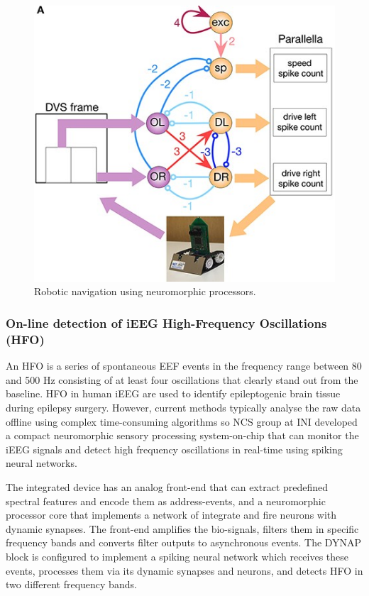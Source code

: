 \documentclass[main]{subfiles}
\begin{document}
%
\begin{figure}[h]
    \centering
    \includegraphics[width=0.8\linewidth]{12_NeuromorphicSystems2/figures/robo.jpg}
    \caption{Robotic navigation using neuromorphic processors.}
    \label{fig:robo}
\end{figure}
%

\subsubsection*{On-line detection of iEEG High-Frequency Oscillations (HFO)}

An HFO is a series of spontaneous EEF events in the frequency range between 80 and 500 Hz consisting of at least four oscillations that clearly stand out from the baseline. HFO in human iEEG are used to identify epileptogenic brain tissue during epilepsy surgery. However, current methods typically analyse the raw data offline using complex time-consuming algorithms so NCS group at INI developed a compact neuromorphic sensory processing system-on-chip that can monitor the iEEG signals and detect high frequency oscillations in real-time using spiking neural networks.

The integrated device has an analog front-end that can extract predefined spectral features and encode them as address-events, and a neuromorphic processor core that implements a network of integrate and fire neurons with dynamic synapses. The front-end amplifies the bio-signals, filters them in specific frequency bands and converts filter outputs to asynchronous events. The DYNAP block is configured to implement a spiking neural network which receives these events, processes them via its dynamic synapses and neurons, and detects HFO in two different frequency bands.
\end{document}
